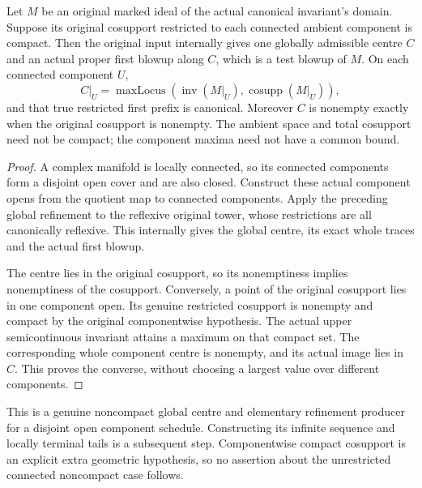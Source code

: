 \begin{theorem}
\label{hir:original-componentwise-compact-canonical-first-step}
\leanok
Let $M$ be an original marked ideal of the actual canonical
invariant's domain. Suppose its original cosupport restricted
to each connected ambient component is compact. Then the
original input internally gives one globally admissible centre
$C$ and an actual proper first blowup along $C$, which is a
test blowup of $M$. On each connected component $U$,
\[
 C|_U=\operatorname{maxLocus}
    (\operatorname{inv}(M|_U),\operatorname{cosupp}(M|_U)),
\]
and that true restricted first prefix is canonical.
Moreover $C$ is nonempty exactly when the original cosupport
is nonempty. The ambient space and total cosupport need not
be compact; the component maxima need not have a common bound.
\end{theorem}
\begin{proof}
A complex manifold is locally connected, so its connected
components form a disjoint open cover and are also closed.
Construct these actual component opens from the quotient map
to connected components. Apply the preceding global refinement
to the reflexive original tower, whose restrictions are all
canonically reflexive. This internally gives the global
centre, its exact whole traces and the actual first blowup.

The centre lies in the original cosupport, so its nonemptiness
implies nonemptiness of the cosupport. Conversely, a point of
the original cosupport lies in one component open. Its
genuine restricted cosupport is nonempty and compact by the
original componentwise hypothesis. The actual upper
semicontinuous invariant attains a maximum on that compact
set. The corresponding whole component centre is nonempty,
and its actual image lies in $C$. This proves the converse,
without choosing a largest value over different components.
\end{proof}

\begin{remark}
This is a genuine noncompact global centre and elementary
refinement producer for a disjoint open component schedule.
Constructing its infinite sequence and locally terminal
tails is a subsequent step. Componentwise compact cosupport
is an explicit extra geometric hypothesis, so no assertion
about the unrestricted connected noncompact case follows.
\end{remark}
